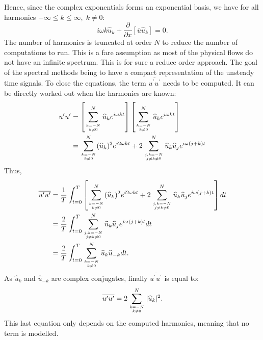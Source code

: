 Hence, since the complex exponentials forms 
an exponential basis, we have for all harmonics 
$-\infty \leq k \leq \infty, \; k \neq 0$:
\begin{equation}
	i \omega k \widehat{u}_k + 
	\frac{\partial}{\partial x} \left[ \overline{u} \widehat{u}_k\right] =
	0.
\end{equation}
The number of harmonics is truncated at order $N$ to reduce the
number of computations to run. This is a fare assumption as most
of the physical flows do not have an infinite spectrum. This
is for sure a reduce order approach. The goal of the spectral
methods being to have a compact representation of the unsteady time
signals. To close the equations, the term 
$\overline{u^\prime u^\prime}$ needs to be computed. It can be 
directly worked out when the harmonics are known:
\begin{equation}
	\begin{split}
		u^\prime u^\prime &= 
		\left[
			\sum_{k=-N \atop k \neq 0}^{N} \widehat{u}_k e^{i \omega k t} 
		\right]
		\left[
			\sum_{k=-N \atop k \neq 0}^{N} \widehat{u}_k e^{i \omega k t} 
		\right] \\
		&= \sum_{k=-N \atop k \neq 0}^{N} (\widehat{u}_k)^2
		   e^{i 2 \omega k t} +
		   2 \sum_{j,k=-N \atop j \neq k \neq 0}^{N} 
		   \widehat{u}_k \widehat{u}_j e^{i \omega (j + k) t} \\
	\end{split}
\end{equation}
Thus,
\begin{equation}
	\begin{split}
		\overline{u^\prime u^\prime} &= 
		\frac{1}{T} \int_{t=0}^{T} \left[ 
			\sum_{k=-N \atop k \neq 0}^{N} (\widehat{u}_k)^2
		   	e^{i 2 \omega k t} +
		   	2 \sum_{j,k=-N \atop j \neq k \neq 0}^{N} 
		   	\widehat{u}_k \widehat{u}_j e^{i \omega (j + k) t} 
		\right] dt\\
		&= \frac{2}{T} \int_{t=0}^{T} \sum_{j,k=-N \atop j \neq k \neq 0}^{N} 
		   	\widehat{u}_k \widehat{u}_j 
		   	e^{i \omega (j + k) t} dt \\
		&= \frac{2}{T} \int_{t=0}^{T} 
			\sum_{k=-N \atop k \neq 0}^{N} 
			\widehat{u}_k \widehat{u}_{-k}  dt.
	\end{split}
\end{equation}
As $\widehat{u}_k$ and $\widehat{u}_{-k}$ are complex conjugates,
finally $\overline{u^\prime u^\prime}$ is equal to:
\begin{equation}
	\overline{u^\prime u^\prime} = 
	2 \sum_{k=-N \atop k \neq 0}^{N} |\widehat{u}_k|^2.
\end{equation}
This last equation only depends on the computed harmonics, meaning
that no term is modelled.

